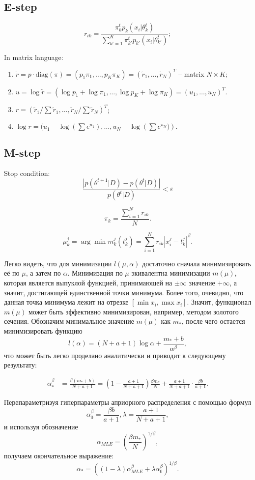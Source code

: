 \documentclass[12pt]{article}
\theoremstyle{definition}
\theoremstyle{plain}
\begin{document}
\subsection{E-step}
$$
r_{ik} = \frac{\pi^t_k p_k(x_i | \theta^t_k)}
{\sum_{k' = 1}^K \pi^t_{k'} p_{k'}(x_i | \theta^t_{k'})};
$$

In matrix language:
\begin{enumerate}
\item $\widetilde{r} = p \cdot \text{diag}(\pi) = (p_1 \pi_1, \ldots, p_K \pi_K) = 
(\widetilde{r}_1, \ldots, \widetilde{r}_N)^T$ --
matrix $N \times K$;
\item $u = \log \widetilde{r} = (\log p_1 + \log \pi_1, \ldots, \log p_K + \log \pi_K) =
(u_1, \ldots, u_N)^T$.
\item $r = (\widetilde{r}_1 / \sum \widetilde{r}_1, \ldots, 
\widetilde{r}_N / \sum \widetilde{r}_N)^T$;
\item $\log r =  (u_1 - \log \left(\sum e^{u_1}\right), \ldots, 
u_N - \log \left(\sum e^{u_N})\right)$.
\end{enumerate}

\subsection{M-step}
Stop condition:
$$
\frac{\left|p(\theta^{t+1} | D) - p(\theta^{t} | D)\right|}{p(\theta^{t} | D)} < \varepsilon
$$

$$
\pi_k = \frac{\sum_{i=1}^N r_{ik}}{N}.
$$


$$
\mu^j_k = \arg \min m_k^j(t_k^j) = \sum_{i = 1}^N r_{ik} |x_i^j - t_k^j|^\beta.
$$

Легко видеть, что для минимизации $l(\mu, \alpha)$ достаточно сначала минимизировать
её по $\mu$, а затем по $\alpha$. Минимизация по $\mu$ экивалентна минимизации 
$m(\mu)$, которая является выпуклой функцией, принимающей на $\pm \infty$ значение
$+ \infty$, а значит, достигающей единственной точки минимума. Более того, очевидно,
что данная точка минимума лежит на отрезке 
$[\min x_i, \max x_i]$. Значит, функционал $m(\mu)$ может быть эффективно минимизирован,
например, методом золотого сечения. Обозначим минимальное 
значение $m(\mu)$ как $m_*$, после чего остается минимизировать функцию
$$
l(\alpha) = (N + a + 1)\log{\alpha} + \frac{m_* + b}{\alpha^\beta},
$$
что может быть легко проделано аналитически и приводит к следующему результату:

\begin{align*}
\alpha_*^\beta &= \frac{\beta(m_* + b)}{N + a + 1} = 
\left(1 - \frac{a + 1}{N + a + 1} \right) \frac{\beta m_*}{N} +
\frac{a + 1}{N + a + 1} \cdot \frac{\beta b}{a + 1}.
\end{align*}

Перепараметризуя гиперпараметры априорного распределения с помощью формул
$$
\alpha_0^\beta = \frac{\beta b}{a + 1}, \lambda = \frac{a + 1}{N + a + 1},
$$
и используя обозначение
$$\alpha_{MLE} = \left(\frac{\beta m_*}{N}\right)^{1 / \beta},$$
получаем окончательное выражение:
$$
\alpha_* = 
\left((1 - \lambda) \alpha_{MLE}^\beta + \lambda \alpha_0^\beta \right)^{1 / \beta}.
$$
		
		
\end{document}
